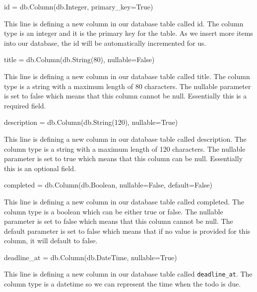 \documentclass{csse4400}
\begin{document}
\begin{code}[language=python,numbers=none]{}
  id = db.Column(db.Integer, primary_key=True)
\end{code}

This line is defining a new column in our database table called id. The column type is an integer and it is the primary key for the table. As we insert more items into our database, the id will be automatically incremented for us.

\begin{code}[language=python,numbers=none]{}
  title = db.Column(db.String(80), nullable=False)
\end{code}

This line is defining a new column in our database table called title. The column type is a string with a maximum length of 80 characters. The nullable parameter is set to false which means that this column cannot be null. Essentially this is a required field.

\begin{code}[language=python,numbers=none]{}
  description = db.Column(db.String(120), nullable=True)
\end{code}

This line is defining a new column in our database table called description. The column type is a string with a maximum length of 120 characters. The nullable parameter is set to true which means that this column can be null. Essentially this is an optional field.

\begin{code}[language=python,numbers=none]{}
  completed = db.Column(db.Boolean, nullable=False, default=False)
\end{code}

This line is defining a new column in our database table called completed. The column type is a boolean which can be either true or false. The nullable parameter is set to false which means that this column cannot be null. The default parameter is set to false which means that if no value is provided for this column, it will default to false.

\begin{code}[language=python,numbers=none]{}
  deadline_at = db.Column(db.DateTime, nullable=True)
\end{code}

This line is defining a new column in our database table called \texttt{deadline\_at}. The column type is a datetime so we can represent the time when the todo is due.
\end{document}
